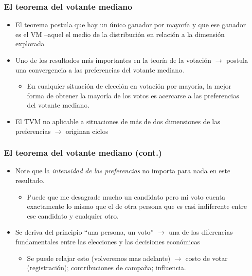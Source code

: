 \documentclass[14pt,aspectratio=169]{beamer}
\begin{document}
\begin{frame}
\frametitle{El teorema del votante mediano}
\begin{itemize}
\item El teorema postula que hay un único ganador por mayoría y que ese ganador es el VM --aquel  el medio de la distribución en relación a la dimensión explorada
\item Uno de los resultados más importantes en la
  teoría de la votación $\longrightarrow$ postula una convergencia a
  las preferencias del votante mediano.
\begin{itemize}\itemsep 5pt \medskip
\item En cualquier situación de elección en votación por mayoría, la
  mejor forma de obtener la mayoría de los votos es acercarse a las
  preferencias del votante mediano.
\end{itemize}
\item El TVM no aplicable a situaciones de más de dos dimensiones de las preferencias $\longrightarrow$ originan ciclos 
\end{itemize}
\end{frame}


\begin{frame}\frametitle{El teorema del votante mediano (cont.)}
\begin{itemize}
\item Note que la \textit{intensidad de las preferencias} no importa
  para nada en este resultado.
\begin{itemize}\itemsep 5pt \medskip
\item Puede que me desagrade mucho un candidato pero mi voto cuenta
  exactamente lo mismo que el de otra persona que es casi indiferente
  entre ese candidato y cualquier otro.
\end{itemize}
\item Se deriva del principio ``una persona, un voto''
  $\longrightarrow$ una de las diferencias fundamentales entre las
  elecciones y las decisiones económicas
\begin{itemize} \itemsep 5pt \medskip
\item Se puede relajar esto (volveremos mas adelante)
  $\longrightarrow$ costo de votar (registración); contribuciones de
  campaña; influencia.
\end{itemize}
\end{itemize}
\end{frame}
\end{document}
